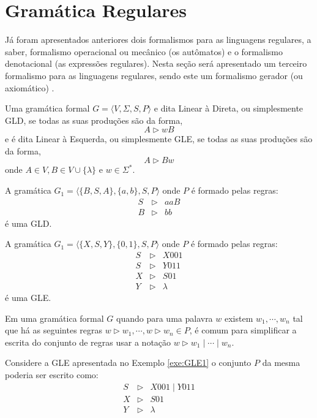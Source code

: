 \section{Gramática Regulares}\label{sec:GramaticaRegular}

Já foram apresentados anteriores dois formalismos para as linguagens regulares, a saber, formalismo operacional ou mecânico (os autômatos) e o formalismo denotacional (as expressões regulares). Nesta seção será apresentado um terceiro formalismo para as linguagens regulares, sendo este um formalismo gerador (ou axiomático) \cite{menezes1998LFA}. 

\begin{definition}\label{def:GramaticaLinear}
	Uma gramática formal $G = \langle V, \Sigma, S, P \rangle$ e dita Linear à Direta, ou simplesmente GLD, se todas as suas produções são da forma, 
	$$A \rhd wB$$
	e é dita Linear à Esquerda, ou simplesmente GLE, se todas as suas produções são da forma, 
	$$A \rhd Bw$$
	onde $A \in V, B \in V \cup \{\lambda\}$ e $w \in \Sigma^*$.
\end{definition}

\begin{example}
	A gramática $G_1 = \langle \{B, S , A\}, \{a, b\}, S, P \rangle$ onde $P$ é formado pelas regras:
	\begin{eqnarray*}
		S & \rhd & aaB\\
		B & \rhd & bb
	\end{eqnarray*}
	é uma GLD.
\end{example}

\begin{example}\label{exe:GLE1}
	A gramática $G_1 = \langle \{X, S , Y\}, \{0, 1\}, S, P \rangle$ onde $P$ é formado pelas regras:
	\begin{eqnarray*}
		S & \rhd & X001\\
		S & \rhd & Y011\\
		X & \rhd & S01\\
		Y & \rhd & \lambda
	\end{eqnarray*}
	é uma GLE.
\end{example}

Em uma gramática formal $G$ quando para uma palavra $w$ existem $w_1, \cdots, w_n$ tal que há as seguintes regras $w \rhd w_1, \cdots, w \rhd w_n \in P$, é comum para simplificar a escrita do conjunto de regras usar a notação $w \rhd w_1 \mid \cdots \mid w_n$. 

\begin{example}\label{exe:GLE}
	Considere a GLE apresentada no Exemplo \ref{exe:GLE1} o conjunto $P$ da mesma poderia ser escrito como:
	\begin{eqnarray*}
		S & \rhd & X001 \mid Y011\\
		X & \rhd & S01\\
		Y & \rhd & \lambda
	\end{eqnarray*}
\end{example}

